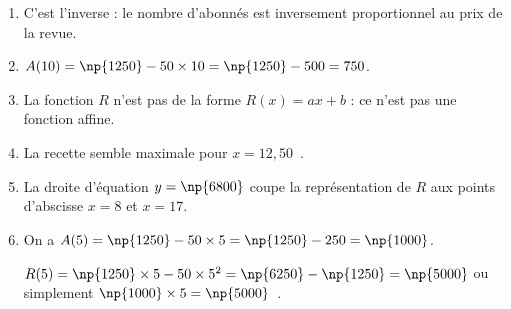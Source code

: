 \documentclass[10pt]{article}
\newcommand{\euro}{\eurologo{}}
\begin{document}
%
%
%
%
%
 
\begin{enumerate}
\item %
C’est l’inverse : le nombre d’abonnés est inversement proportionnel au prix de la revue.
\item %
$A(10) = \np{1250} - 50 \times 10 = \np{1250} - 500 = 750$. 
\item %
La fonction $R$ n’est pas de la forme $R(x) = ax + b$ : ce n’est pas une fonction affine.
\item %
La recette semble maximale pour $x = 12,50$~\euro.
\item %
La droite d’équation $y = \np{6800}$ coupe la représentation de $R$ aux points d’abscisse $x = 8$ et $x = 17$. 
\item %
On a $A(5) = \np{1250} - 50 \times 5 = \np{1250} - 250 = \np{1000}$.

$R(5) = \np{1250}\times 5 - 50 \times 5^2 = \np{6250} - \np{1250} = \np{5000}$ ou simplement $\np{1000} \times 5 = \np{5000}$~\euro.
\end{enumerate}

\bigskip
\end{document}
